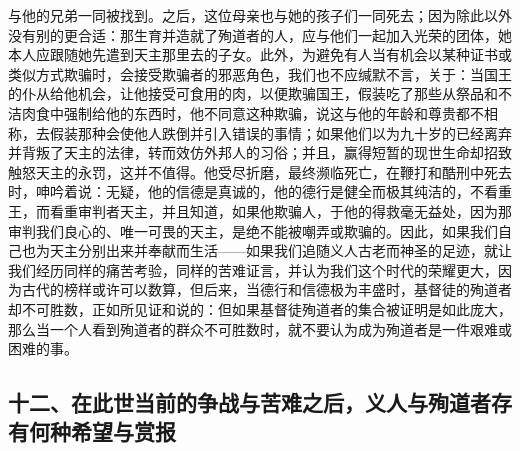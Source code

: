与他的兄弟一同被找到。之后，这位母亲也与她的孩子们一同死去；因为除此以外没有别的更合适：那生育并造就了殉道者的人，应与他们一起加入光荣的团体，她本人应跟随她先遣到天主那里去的子女。此外，为避免有人当有机会以某种证书或类似方式欺骗时，会接受欺骗者的邪恶角色，我们也不应缄默不言，关于：当国王的仆从给他机会，让他接受可食用的肉，以便欺骗国王，假装吃了那些从祭品和不洁肉食中强制给他的东西时，他不同意这种欺骗，说这与他的年龄和尊贵都不相称，去假装那种会使他人跌倒并引入错误的事情；如果他们以为九十岁的已经离弃并背叛了天主的法律，转而效仿外邦人的习俗；并且，赢得短暂的现世生命却招致触怒天主的永罚，这并不值得。他受尽折磨，最终濒临死亡，在鞭打和酷刑中死去时，呻吟着说：无疑，他的信德是真诚的，他的德行是健全而极其纯洁的，不看重王，而看重审判者天主，并且知道，如果他欺骗人，于他的得救毫无益处，因为那审判我们良心的、唯一可畏的天主，是绝不能被嘲弄或欺骗的。因此，如果我们自己也为天主分别出来并奉献而生活——如果我们追随义人古老而神圣的足迹，就让我们经历同样的痛苦考验，同样的苦难证言，并认为我们这个时代的荣耀更大，因为古代的榜样或许可以数算，但后来，当德行和信德极为丰盛时，基督徒的殉道者却不可胜数，正如所见证和说的：但如果基督徒殉道者的集合被证明是如此庞大，那么当一个人看到殉道者的群众不可胜数时，就不要认为成为殉道者是一件艰难或困难的事。\par


\subsection{十二、在此世当前的争战与苦难之后，义人与殉道者存有何种希望与赏报}

